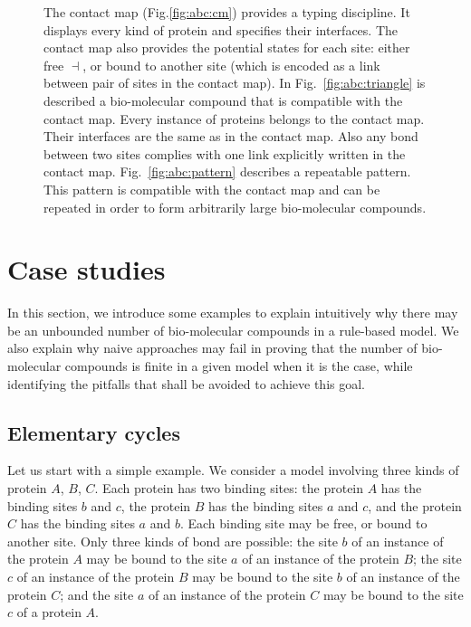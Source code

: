 \documentclass{entcs}
\newcommand{\freesymbol}{\dashv}
\begin{document}
\begin{figure}
{The contact map  (Fig.\ref{fig:abc:cm}) provides a typing discipline.
It displays every kind of protein and specifies their interfaces.
The contact map also provides the potential states for each site:
either free $\freesymbol$, or bound to another site (which is encoded as a link between pair of sites in the contact map).
In Fig.~\ref{fig:abc:triangle} is described a bio-molecular compound that is compatible with the contact map. Every instance of proteins belongs to the contact map. Their interfaces are the same as in the contact map.
Also any bond between two sites complies with one link explicitly written in the contact map.
Fig.~\ref{fig:abc:pattern} describes a repeatable pattern.
This pattern is compatible with the contact map and can be repeated in order to form arbitrarily large bio-molecular compounds.
}\label{fig:abc}
\end{figure}
\section{Case studies}
\label{sec:case-study}

In this section, we introduce some examples to explain intuitively why there may be an unbounded number of bio-molecular compounds in a rule-based model.  We also explain why naive approaches may fail in proving that the number of bio-molecular compounds is finite in a given model when it is the case,  while identifying the pitfalls that shall be avoided to achieve this goal.

\subsection{Elementary cycles}

\label{sec:triangle}

Let us start with a simple example. We consider a model involving three kinds of protein $A$, $B$, $C$. Each protein has two binding sites: the protein $A$ has the binding sites $b$ and $c$, the protein $B$ has the binding sites $a$ and $c$, and the protein $C$ has the binding sites $a$ and $b$. Each binding site may be free, or bound to another site. Only three kinds of bond are possible: the site $b$ of an instance of the protein $A$ may be bound to the site $a$ of an instance of the protein $B$; the site $c$ of an instance of the  protein $B$ may be bound to the site $b$ of an instance of the protein $C$; and the site $a$ of an instance of the protein $C$ may be bound to the site $c$ of a protein $A$.
\end{document}
